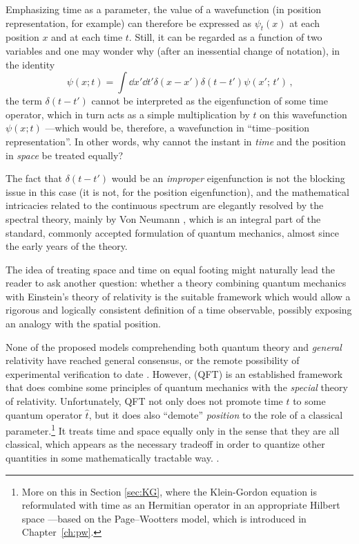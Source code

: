Emphasizing time as a parameter, the value of a wavefunction
(in position representation, for example)
can therefore be expressed as $\psi_{t}(x)$ at each position $x$
and at each time $t$.
Still, it can be regarded as a function of two variables
and one may wonder why (after an inessential change of notation),
in the identity
\begin{equation}\label{eq:diracdeltaxt}
  \psi(x; t) = \int \dd{x'}\dd{t'} \delta(x-x')\delta(t-t') \psi(x';\, t') \,\text{,}
\end{equation}
the term $\delta(t-t')$ cannot be interpreted as the eigenfunction of some time operator,
which in turn acts as a simple multiplication by $t$ on this
wavefunction $\psi(x; t)$ ---which would be, therefore, a wavefunction in ``time--position representation''.
In other words, why cannot the instant in \emph{time}
and the position in \emph{space}
be treated equally?

The fact that $\delta(t-t')$ would be an \emph{improper} eigenfunction
is not the blocking issue in this case (it is not, for the position eigenfunction),
and the mathematical intricacies related to the continuous spectrum are
elegantly resolved by the spectral theory, mainly by Von Neumann
\parencite{VonNeumann}, which is an integral part of the standard, commonly accepted
formulation of quantum mechanics, almost since the early years of the theory.

The idea of treating space and time on equal footing might naturally lead the reader to
ask another question: whether a theory combining quantum mechanics with Einstein's
theory of relativity is the suitable framework which would allow a rigorous and logically consistent
definition of a time observable,
possibly exposing an analogy with the spatial position.

None of the proposed models comprehending both quantum theory and \emph{general} relativity
have reached general consensus,
or the remote possibility of experimental verification to date \parencite{QGravIntro}.
However,  (QFT) is an established framework that does combine
some principles
of quantum mechanics with the \emph{special} theory of relativity.
Unfortunately, QFT not only does not promote time $t$ to some quantum operator $\hat{t}$,
but it does also ``demote'' \emph{position} to the role of a classical parameter.\footnote{
  More on this in Section \ref{sec:KG}, where the Klein-Gordon equation is reformulated
  with time as an Hermitian operator in an appropriate Hilbert space
  ---based on the Page--Wootters model, which is introduced in Chapter~\ref{ch:pw}.
}
It treats time and space equally only in the sense that they are all classical,
which appears as the necessary tradeoff in order to quantize other quantities
in some mathematically tractable way. \parencite[\S I.1]{SrednickiQFT}.

